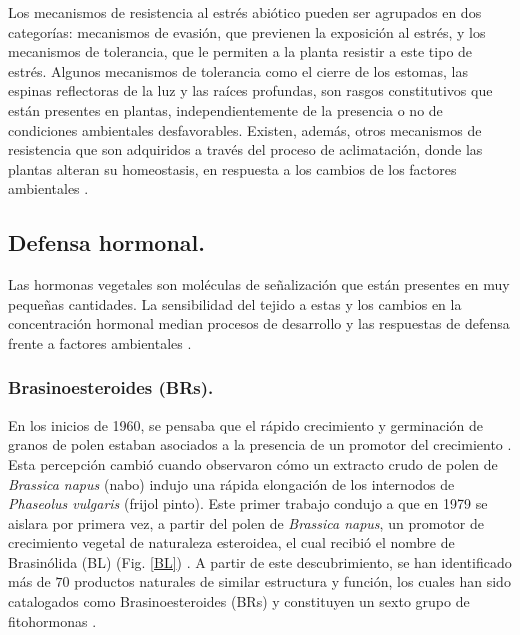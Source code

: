 Los mecanismos de resistencia al estr\'es abi\'otico pueden ser agrupados en dos categor\'ias: mecanismos de evasi\'on, que previenen la exposici\'on al estr\'es, y los mecanismos de tolerancia, que le permiten a la planta resistir a este tipo de estr\'es. Algunos mecanismos de tolerancia como el cierre de los estomas, las espinas reflectoras de la luz y las ra\'ices profundas, son rasgos constitutivos que est\'an presentes en plantas, independientemente de la presencia o no de condiciones ambientales desfavorables. Existen, adem\'as, otros mecanismos de resistencia que son adquiridos a través del proceso de aclimatación, donde las plantas alteran su homeostasis, en respuesta a los cambios de los factores ambientales \citep{buchanan2015biochemistry}. \\

\subsection{Defensa hormonal.}

Las hormonas vegetales son moléculas de señalización que están presentes en muy pequeñas cantidades. La sensibilidad del tejido a estas y los cambios en la concentración hormonal median procesos de desarrollo y las respuestas de defensa frente a factores ambientales \citep{verma2016plant}.

\subsubsection{Brasinoesteroides (BRs).}

En los inicios de 1960, se pensaba que el rápido crecimiento y germinación de granos de polen estaban asociados a la presencia de un promotor del crecimiento \citep{buchanan2015biochemistry}. Esta percepci\'on cambi\'o cuando \cite{mitchell1970brassins} observaron c\'omo un extracto crudo de polen de \textit{Brassica napus} (nabo) indujo una rápida elongación de los internodos de \textit{Phaseolus vulgaris} (frijol pinto). Este primer trabajo condujo a que en 1979 se aislara por primera vez, a partir del polen de \textit{Brassica napus}, un promotor de crecimiento vegetal de naturaleza esteroidea, el cual recibi\'o el nombre de Brasin\'olida (BL) (Fig. \ref{BL}) \citep{grove1979brassinolide}. A partir de este descubrimiento, se han identificado m\'as de $70$ productos naturales de similar estructura y funci\'on, los cuales han sido catalogados como Brasinoesteroides (BRs) y constituyen un sexto grupo de fitohormonas \citep{kutschera2012brassinosteroid}. \\

